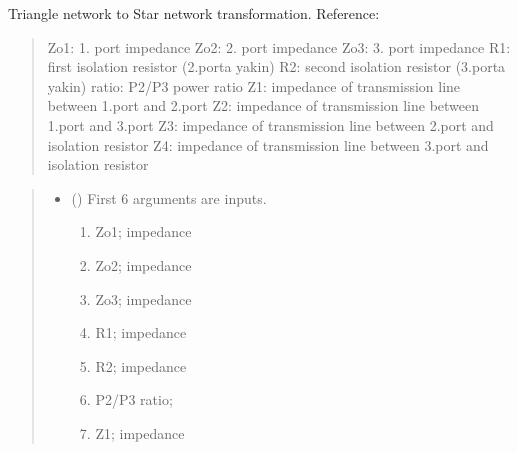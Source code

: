 \documentclass[letterpaper,10pt,english]{sphinxmanual}
\begin{document}

\begin{fulllineitems}
\label{\detokenize{components:components.GyselPowerDivider}}
\pysigstartsignatures
{}
\pysigstopsignatures
\sphinxAtStartPar
Triangle network to Star network transformation.
Reference:
\begin{quote}

\sphinxAtStartPar
Zo1: 1. port impedance
Zo2: 2. port impedance
Zo3: 3. port impedance
R1: first isolation resistor (2.porta yakin)
R2: second isolation resistor (3.porta yakin)
ratio: P2/P3 power ratio
Z1: impedance of transmission line between 1.port and 2.port
Z2: impedance of transmission line between 1.port and 3.port
Z3: impedance of transmission line between 2.port and isolation resistor
Z4: impedance of transmission line between 3.port and isolation resistor
\end{quote}
\begin{quote}\begin{description}
\begin{itemize}
\item {}
\sphinxAtStartPar
{} () \textendash{}
\sphinxAtStartPar
First 6 arguments are inputs.
\begin{enumerate}
%
\item {}
\sphinxAtStartPar
Zo1;  impedance

\item {}
\sphinxAtStartPar
Zo2;  impedance

\item {}
\sphinxAtStartPar
Zo3;  impedance

\item {}
\sphinxAtStartPar
R1; impedance

\item {}
\sphinxAtStartPar
R2; impedance

\item {}
\sphinxAtStartPar
P2/P3 ratio;

\item {}
\sphinxAtStartPar
Z1; impedance


\end{enumerate}
\end{itemize}
\end{description}
\end{quote}
\end{fulllineitems}
\end{document}
